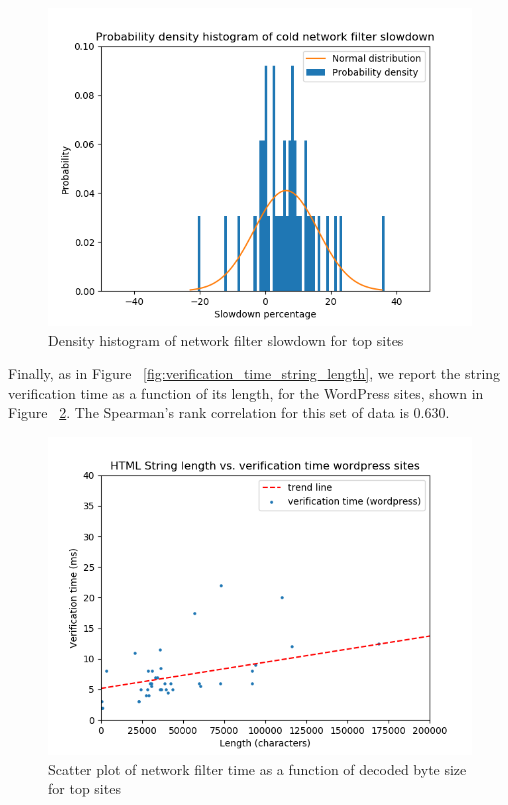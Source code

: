 \begin{figure}[h]
	\includegraphics[scale=0.5]{results/density_histogram_filter_slowdown_wordpress}
	\caption{Density histogram of network filter slowdown for top sites}
	\label{fig:histogram_slowdown_wordpress}
\end{figure}

Finally, as in Figure ~\ref{fig:verification_time_string_length}, we report the string verification time as a function of its length, for the WordPress sites, shown in Figure ~\ref{fig:verification_time_string_length_wordpress}. The Spearman's rank correlation for this set of data is 0.630. 

\begin{figure}[h]
	\includegraphics[scale=0.5]{results/string_length_vs_verification_time_wordpress}
	\caption{Scatter plot of network filter time as a function of decoded byte size for top sites}
	\label{fig:verification_time_string_length_wordpress}
\end{figure}